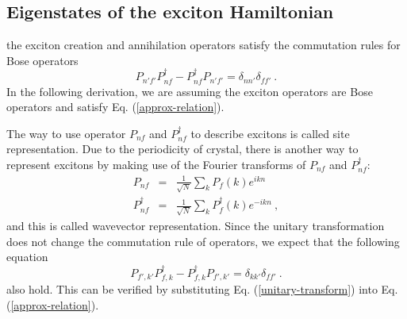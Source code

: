 \subsection{Eigenstates of the exciton Hamiltonian}
 
the exciton creation and annihilation operators satisfy the commutation rules for Bose operators
\begin{equation}
P_{n'f'}P_{nf}^{\dagger} - P_{nf}^{\dagger}P_{n'f'}=\delta_{nn'}\delta_{ff'} \ . \label{approx-relation}
\end{equation}
In the following derivation, we are assuming the exciton operators are Bose operators and satisfy Eq. (\ref{approx-relation}). 

The way to use operator $P_{nf}$ and $P_{nf}^{\dagger}$ to describe excitons is called site representation. Due to the periodicity of crystal, there is another way to represent excitons by making use of the Fourier transforms of $P_{nf}$ and $P_{nf}^{\dagger}$: 
\begin{eqnarray}
P_{nf} &=& \frac{1}{\sqrt{N}} \sum_{k} P_{f}(k) e^{ikn} \nonumber \\
P_{nf}^{\dagger} &=& \frac{1}{\sqrt{N}} \sum_{k} P_{f}^{\dagger}(k) e^{-ikn} \ , \label{unitary-transform}
\end{eqnarray}
and this is called wavevector representation. Since the unitary transformation does not change the commutation rule of operators, we expect that the following equation
\begin{equation}
P_{f',k'}P_{f,k}^{\dagger} - P_{f,k}^{\dagger}P_{f',k'}=\delta_{kk'}\delta_{ff'} \ . \label{approx-relation-in-wavevector}
\end{equation}
also hold. This can be verified by substituting Eq. (\ref{unitary-transform}) into Eq. (\ref{approx-relation}). 





